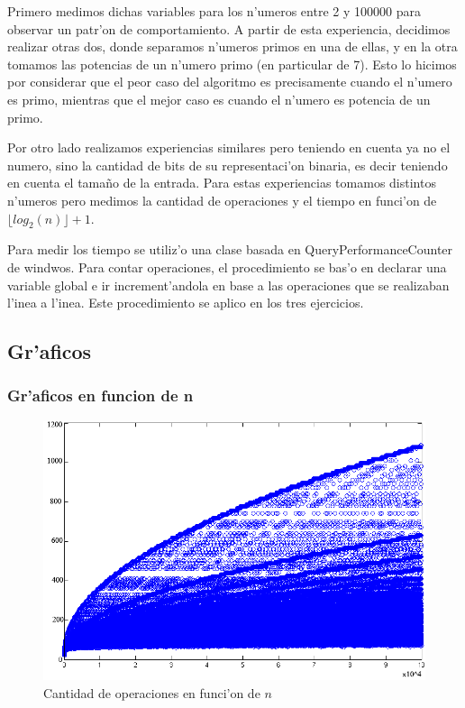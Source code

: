 Primero medimos dichas variables para los n'umeros entre 2 y 100000 para observar un patr'on de comportamiento. A partir de esta experiencia, decidimos realizar otras dos, donde separamos n'umeros primos en una de ellas, y en la otra tomamos las 
potencias de un n'umero primo (en particular de 7). Esto lo hicimos por considerar que el peor caso del algoritmo es 
precisamente cuando el n'umero es primo, mientras que el mejor caso es cuando el n'umero es potencia de un primo. 

Por otro lado realizamos experiencias similares pero teniendo en cuenta ya no el numero, sino la cantidad de bits 
de su representaci'on binaria, es decir teniendo en cuenta el tama\~{n}o de la entrada. Para estas experiencias 
tomamos distintos n'umeros pero medimos la cantidad de operaciones y el tiempo en funci'on de $\lfloor log_2(n) \rfloor + 1$.

Para medir los tiempo se utiliz'o una clase basada en QueryPerformanceCounter de windwos. Para contar operaciones, el procedimiento se bas'o en declarar una variable global e ir increment'andola en base a las operaciones que se realizaban l'inea a l'inea. Este procedimiento se aplico en los tres ejercicios.

\subsection{Gr'aficos}
\subsubsection{Gr'aficos en funcion de n}

\begin{figure}[H]
\centering
\includegraphics[scale=0.7]{../../codigo/ejercicio1/benchmark/graficos/todos_los_numeros/graficosTodos.png}
\caption{Cantidad de operaciones en funci'on de $n$}
\label{Ej1fig1}
\end{figure}

